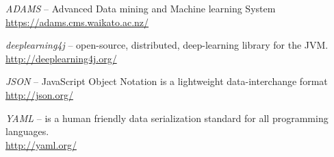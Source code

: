%

\begin{thebibliography}{999}

		\textit{ADAMS} -- Advanced Data mining and Machine learning System \\
		\url{https://adams.cms.waikato.ac.nz/}{}
		
		\textit{deeplearning4j} -- open-source, distributed,
		deep-learning library for the JVM. \\
		\url{http://deeplearning4j.org/}{}

		\textit{JSON} -- JavaScript Object Notation is a lightweight data-interchange format \\
		\url{http://json.org/}{}

		\textit{YAML} -- is a human friendly data serialization
                standard for all programming languages. \\
		\url{http://yaml.org/}{}

\end{thebibliography}
